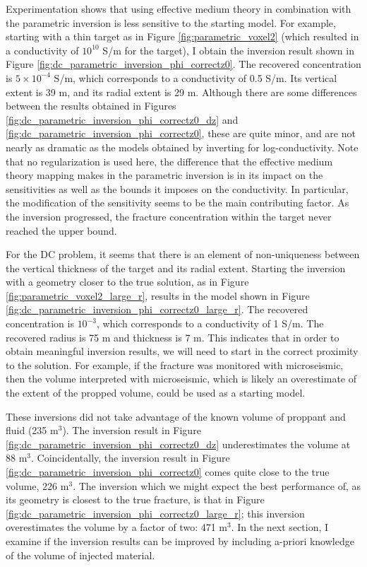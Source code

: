 Experimentation shows that using effective medium theory in combination with the parametric inversion is less sensitive to the starting model. For example, starting with a thin target as in Figure \ref{fig:parametric_voxel2} (which resulted in a conductivity of $10^{10}$ S/m for the target), I obtain the inversion result shown in Figure \ref{fig:dc_parametric_inversion_phi_correctz0}. The recovered concentration is $5 \times 10^{-4}$ S/m, which corresponds to a conductivity of 0.5 S/m. Its vertical extent is 39 m, and its radial extent is 29 m. Although there are some differences between the results obtained in Figures \ref{fig:dc_parametric_inversion_phi_correctz0_dz} and \ref{fig:dc_parametric_inversion_phi_correctz0}, these are quite minor, and are not nearly as dramatic as the models obtained by inverting for log-conductivity. Note that no regularization is used here, the difference that the effective medium theory mapping makes in the parametric inversion is in its impact on the sensitivities as well as the bounds it imposes on the conductivity. In particular, the modification of the sensitivity seems to be the main contributing factor. As the inversion progressed, the fracture concentration within the target never reached the upper bound.





For the DC problem, it seems that there is an element of non-uniqueness between the vertical thickness of the target and its radial extent. Starting the inversion with a geometry closer to the true solution, as in Figure \ref{fig:parametric_voxel2_large_r}, results in the model shown in Figure \ref{fig:dc_parametric_inversion_phi_correctz0_large_r}. The recovered concentration is $10^{-3}$, which corresponds to a conductivity of 1 S/m. The recovered radius is 75 m and thickness is 7 m. This indicates that in order to obtain meaningful inversion results, we will need to start in the correct proximity to the solution. For example, if the fracture was monitored with microseismic, then the volume interpreted with microseismic, which is likely an overestimate of the extent of the propped volume, could be used as a starting model.








These inversions did not take advantage of the known volume of proppant and fluid (235 m$^3$). The inversion result in Figure \ref{fig:dc_parametric_inversion_phi_correctz0_dz} underestimates the volume at 88 m$^3$. Coincidentally, the inversion result in Figure \ref{fig:dc_parametric_inversion_phi_correctz0} comes quite close to the true volume,
226 m$^3$. The inversion which we might expect the best performance of, as its geometry is closest to the true fracture, is that in Figure \ref{fig:dc_parametric_inversion_phi_correctz0_large_r}; this inversion overestimates the volume by a factor of two: 471 m$^3$. In the next section, I examine if the inversion results can be improved by including a-priori knowledge of the volume of injected material.

